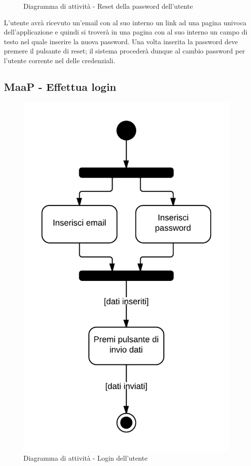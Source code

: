 \begin{figure}[H]
\caption{Diagramma di attività - Reset della password dell'utente}
\end{figure}

L'utente avrà ricevuto un'email con al suo interno un link ad una pagina univoca dell'applicazione  e quindi si troverà in una pagina con al suo interno un campo di testo nel quale inserire la nuova password. Una volta inserita la password deve premere il pulsante di reset; il sistema  procederà dunque al cambio password per l'utente corrente nel  delle credenziali.

\subsection{MaaP - Effettua login}

\begin{figure}[H]
\centering
\includegraphics[scale=0.2]{uml/MaaP - Effettua login.png}
\caption{Diagramma di attività - Login dell'utente}
\end{figure}

